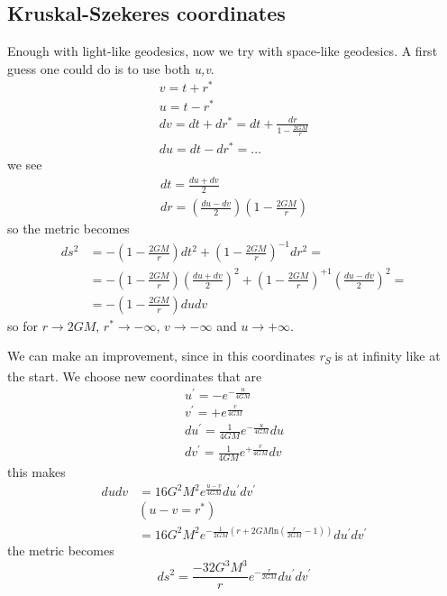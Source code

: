 \subsection{Kruskal-Szekeres coordinates}
Enough with light-like geodesics, now we try with space-like geodesics. A first guess one could do is to use both \emph{u,v}. 
\begin{gather*}
v = t + r^{*} \\
u = t - r^{*}\\
dv = dt + dr^{*} = dt + \frac{d r}{ 1 - \frac{2GM}{r}}\\
du = dt - dr^{*} = \ldots 
\end{gather*}
we see 
\begin{gather*}
dt = \frac{du + dv}{2} \\
dr = \left( \frac{du-dv}{2} \right)\left( 1- \frac{2GM}{r} \right)
\end{gather*}
so the metric becomes
\begin{align}
	ds^{2} &= - \left( 1- \frac{2GM}{r} \right)dt^{2} + \left( 1 - \frac{2GM}{r} \right)^{-1} dr^{2} = \\
	       &= - \left( 1 - \frac{2GM}{r}  \right)\left( \frac{du + dv}{2} \right)^{2} + \left( 1 - \frac{2GM}{r} \right) ^{+1} \left( \frac{du - dv}{2} \right)^{2} = \\
	       &= - \left( 1 - \frac{2GM}{r} \right)dudv
\end{align}
so for $r \to  2GM$, $r^{*}\to  -\infty$, $v \to  -\infty$ and $u \to +\infty$.\par
We can make an improvement, since in this coordinates \emph{r\textsubscript{S}} is at infinity like at the start. We choose new coordinates that are
\begin{gather*}
u^{\prime } = -e ^{- \frac{u}{4GM}} \\
v^{\prime } = + e ^{\frac{v}{4GM}}\\
du^{\prime } = \frac{1}{4GM} e^{-\frac{u}{4GM}}du\\
dv^{\prime } = \frac{1}{4GM} e^{+\frac{v}{4GM}}dv
\end{gather*}
this makes
\begin{align}
	dudv &= 16G^{2}M^{2} e^{ \frac{u-v}{4GM}} du^{\prime }dv^{\prime }\\
	     &\left( u -v = r^{*} \right) \\
	     &=16G^{2}M^{2} e^{ -\frac{1}{2GM} \left( r + 2GM \text{ln}\left( \frac{r}{2GM} -1 \right)	 \right)} du^{\prime }dv^{\prime }
\end{align}
the metric becomes
\begin{equation}
ds^{2} = \frac{-32G^{3}M^{3}}{r} e ^{ -\frac{r}{2GM}} du^{\prime }dv^{\prime }
\end{equation}
